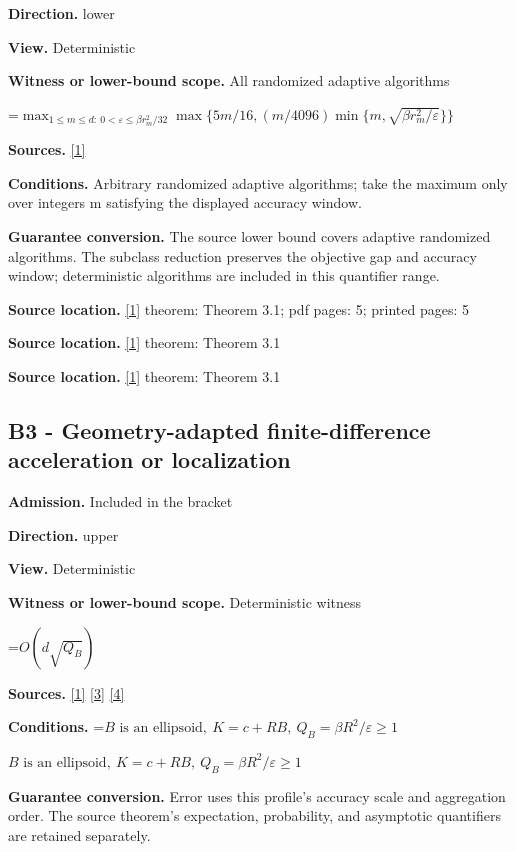 \documentclass[10pt,a4paper]{article}
\newcommand{\AtlasMath}[1]{\par\begingroup\centering\setbox0=\hbox{$\displaystyle #1$}\ifdim\wd0>1.4\linewidth\typeout{ATLAS WIDE FORMULA: \the\wd0}\fi\ifdim\wd0>\linewidth\resizebox{\linewidth}{!}{\box0}\else\box0\fi\par\endgroup}
\newcommand{\AtlasInlineMath}[1]{\begingroup\setbox0=\hbox{$#1$}\ifdim\wd0>.4\linewidth\endgroup\AtlasMath{#1}\else\endgroup$#1$\fi}
\begin{document}
\textbf{Direction.} lower

\textbf{View.} Deterministic

\textbf{Witness or lower-bound scope.} All randomized adaptive algorithms

\AtlasMath{\max_{1\le m\le d:\ 0<\varepsilon\le\beta r_m^2/32}\max\{5m/16,(m/4096)\min\{m,\sqrt{\beta r_m^2/\varepsilon}\}\}}
\textbf{Sources.} \href{https://arxiv.org/html/2610.00345v1}{[1]}

\textbf{Conditions.} Arbitrary randomized adaptive algorithms; take the maximum only over integers m satisfying the displayed accuracy window.

\textbf{Guarantee conversion.} The source lower bound covers adaptive randomized algorithms. The subclass reduction preserves the objective gap and accuracy window; deterministic algorithms are included in this quantifier range.

\textbf{Source location.} \href{https://arxiv.org/html/2610.00345v1}{[1]} theorem: Theorem 3.1; pdf pages: 5; printed pages: 5

\textbf{Source location.} \href{https://arxiv.org/html/2610.00345v1}{[1]} theorem: Theorem 3.1

\textbf{Source location.} \href{https://arxiv.org/html/2610.00345v1}{[1]} theorem: Theorem 3.1

\subsection{B3 - Geometry-adapted finite-difference acceleration or localization}
\textbf{Admission.} Included in the bracket

\textbf{Direction.} upper

\textbf{View.} Deterministic

\textbf{Witness or lower-bound scope.} Deterministic witness

\AtlasMath{O(d\sqrt{Q_B})}
\textbf{Sources.} \href{https://arxiv.org/html/2610.00345v1}{[1]} \href{https://arxiv.org/html/2607.16558v2}{[3]} \href{https://www.mathnet.ru/php/archive.phtml?jrnid=mzm&option_lang=eng&paperid=1697&wshow=paper}{[4]}

\textbf{Conditions.} \AtlasInlineMath{B\text{ is an ellipsoid},\ K=c+RB,\ Q_B=\beta R^2/\varepsilon\ge1}

\textbf{Guarantee conversion.} Error uses this profile's accuracy scale and aggregation order. The source theorem's expectation, probability, and asymptotic quantifiers are retained separately.
\end{document}
